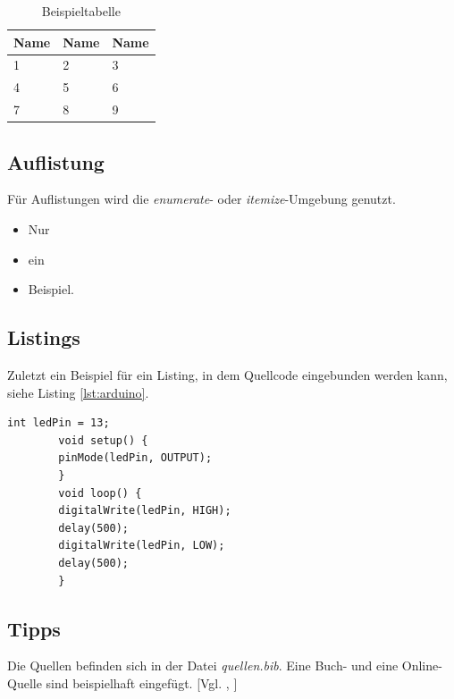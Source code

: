\documentclass[12pt,a4paper,bibliography=totocnumbered,listof=totocnumbered]{scrartcl}
\begin{document}
    \vspace{1em}
    \begin{table}[!h]
        \centering
        \begin{tabular}{|l|l|l|}
            \hline
            \textbf{Name} & \textbf{Name} & \textbf{Name}\\
            \hline
            1 & 2 & 3\\
            \hline
            4 & 5 & 6\\
            \hline
            7 & 8 & 9\\
            \hline
        \end{tabular}
        \caption{Beispieltabelle}
        \label{tab:beispiel}
    \end{table}


    \subsection{Auflistung}
    Für Auflistungen wird die \textit{enumerate}- oder \textit{itemize}-Umgebung genutzt.

    \begin{itemize}
        \item Nur
        \item ein
        \item Beispiel.
    \end{itemize}

    \subsection{Listings}
    Zuletzt ein Beispiel für ein Listing, in dem Quellcode eingebunden werden kann, siehe Listing \ref{lst:arduino}.

    \vspace{1em}
    \begin{lstlisting}[caption=Arduino Beispielprogramm, label=lst:arduino]
        int ledPin = 13;
        void setup() {
        pinMode(ledPin, OUTPUT);
        }
        void loop() {
        digitalWrite(ledPin, HIGH);
        delay(500);
        digitalWrite(ledPin, LOW);
        delay(500);
        }
    \end{lstlisting}

    \subsection{Tipps}
    Die Quellen befinden sich in der Datei \textit{quellen.bib}. Eine Buch- und eine Online-Quelle sind beispielhaft eingefügt. [Vgl. \cite{buch}, \cite{online}]
\end{document}
